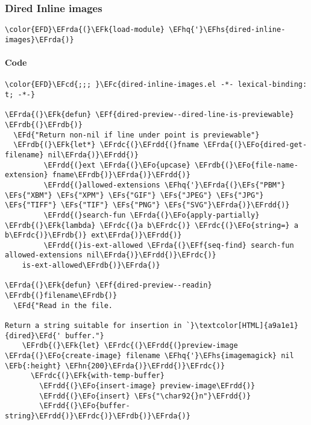 \documentclass[a4wide,10pt]{article}
\newcommand{\EFc}[1]{\textcolor{EFc}{#1}} %
\newcommand{\EFcd}[1]{\textcolor{EFcd}{#1}} %
\newcommand{\EFs}[1]{\textcolor{EFs}{#1}} %
\newcommand{\EFd}[1]{\textcolor{EFd}{#1}} %
\newcommand{\EFk}[1]{\textcolor{EFk}{#1}} %
\newcommand{\EFb}[1]{\textcolor{EFb}{#1}} %
\newcommand{\EFf}[1]{\textcolor{EFf}{#1}} %
\newcommand{\EFo}[1]{\textcolor{EFo}{#1}} %
\newcommand{\EFhn}[1]{\textcolor{EFhn}{\textbf{#1}}} %
\newcommand{\EFhq}[1]{\textcolor{EFhq}{#1}} %
\newcommand{\EFhs}[1]{\textcolor{EFhs}{#1}} %
\newcommand{\EFrda}[1]{\textcolor{EFrda}{#1}} %
\newcommand{\EFrdb}[1]{\textcolor{EFrdb}{#1}} %
\newcommand{\EFrdc}[1]{\textcolor{EFrdc}{#1}} %
\newcommand{\EFrdd}[1]{\textcolor{EFrdd}{#1}} %
\begin{document}
\subsubsection{Dired Inline images}
\label{sec:org68a8be8}
\begin{Code}
\begin{Verbatim}
\color{EFD}\EFrda{(}\EFk{load-module} \EFhq{'}\EFhs{dired-inline-images}\EFrda{)}
\end{Verbatim}
\end{Code}
\paragraph{Code}
\label{sec:orge121f3e}
\begin{Code}
\begin{Verbatim}
\color{EFD}\EFcd{;;; }\EFc{dired-inline-images.el -*- lexical-binding: t; -*-}

\EFrda{(}\EFk{defun} \EFf{dired-preview--dired-line-is-previewable} \EFrdb{(}\EFrdb{)}
  \EFd{"Return non-nil if line under point is previewable"}
  \EFrdb{(}\EFk{let*} \EFrdc{(}\EFrdd{(}fname \EFrda{(}\EFo{dired-get-filename} nil\EFrda{)}\EFrdd{)}
         \EFrdd{(}ext \EFrda{(}\EFo{upcase} \EFrdb{(}\EFo{file-name-extension} fname\EFrdb{)}\EFrda{)}\EFrdd{)}
         \EFrdd{(}allowed-extensions \EFhq{'}\EFrda{(}\EFs{"PBM"} \EFs{"XBM"} \EFs{"XPM"} \EFs{"GIF"} \EFs{"JPEG"} \EFs{"JPG"} \EFs{"TIFF"} \EFs{"TIF"} \EFs{"PNG"} \EFs{"SVG"}\EFrda{)}\EFrdd{)}
         \EFrdd{(}search-fun \EFrda{(}\EFo{apply-partially} \EFrdb{(}\EFk{lambda} \EFrdc{(}a b\EFrdc{)} \EFrdc{(}\EFo{string=} a b\EFrdc{)}\EFrdb{)} ext\EFrda{)}\EFrdd{)}
         \EFrdd{(}is-ext-allowed \EFrda{(}\EFf{seq-find} search-fun allowed-extensions nil\EFrda{)}\EFrdd{)}\EFrdc{)}
    is-ext-allowed\EFrdb{)}\EFrda{)}

\EFrda{(}\EFk{defun} \EFf{dired-preview--readin} \EFrdb{(}filename\EFrdb{)}
  \EFd{"Read in the file.

Return a string suitable for insertion in `}\textcolor[HTML]{a9a1e1}{dired}\EFd{' buffer."}
    \EFrdb{(}\EFk{let} \EFrdc{(}\EFrdd{(}preview-image \EFrda{(}\EFo{create-image} filename \EFhq{'}\EFhs{imagemagick} nil \EFb{:height} \EFhn{200}\EFrda{)}\EFrdd{)}\EFrdc{)}
      \EFrdc{(}\EFk{with-temp-buffer}
        \EFrdd{(}\EFo{insert-image} preview-image\EFrdd{)}
        \EFrdd{(}\EFo{insert} \EFs{"\char92{}n"}\EFrdd{)}
        \EFrdd{(}\EFo{buffer-string}\EFrdd{)}\EFrdc{)}\EFrdb{)}\EFrda{)}


\end{Verbatim}
\end{Code}
\end{document}
